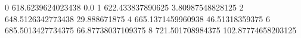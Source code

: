 0 618.6239624023438 0.0
1 622.433837890625 3.80987548828125
2 648.5126342773438 29.888671875
4 665.1371459960938 46.51318359375
6 685.5013427734375 66.87738037109375
8 721.501708984375 102.87774658203125

